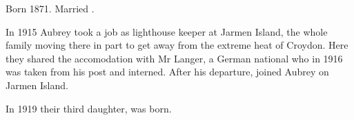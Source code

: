 
Born 1871. Married .

In 1915 Aubrey took a job as lighthouse keeper at Jarmen Island,
the whole family moving there in part to get away from the extreme heat of Croydon.\cite{Connie1983}
Here they shared the accomodation with Mr Langer,
a German national who in 1916 was taken from his post and interned.\cite{Connie1983}
After his departure,  joined Aubrey on Jarmen Island.

In 1919 their third daughter,  was born.
